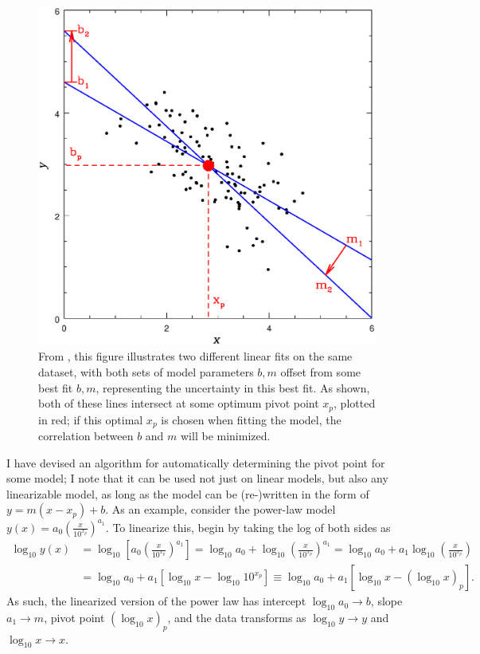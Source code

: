 \begin{figure}
    \centering
    \includegraphics[width=0.8\linewidth]{figures/fig_pivot.eps}
    \caption{From \textcite{trotter}, this figure illustrates two different linear fits on the same dataset, with both sets of model parameters $b,m$ offset from some best fit $b,m$, representing the uncertainty in this best fit. As shown, both of these lines intersect at some optimum pivot point $x_p$, plotted in red; if this optimal $x_p$ is chosen when fitting the model, the correlation between $b$ and $m$ will be minimized.}
    \label{fig:pivotpoint}
\end{figure}

I have devised an algorithm for automatically determining the pivot point for some model; I note that it can be used not just on linear models, but also any linearizable model, as long as the model can be (re-)written in the form of $y=m(x-x_p)+b$. As an example, consider the power-law model $\displaystyle y(x)=a_0\left(\frac{x}{10^{x_p}}\right)^{a_1}$. To linearize this, begin by taking the log of both sides as
\begin{equation}
\begin{split}
    \log_{10}y(x)&=\log_{10}\left[a_0\left(\frac{x}{10^{x_p}}\right)^{a_1}\right]=\log_{10}a_0 + \log_{10}\left(\frac{x}{10^{x_p}}\right)^{a_1}=\log_{10}a_0 + a_1\log_{10}\left(\frac{x}{10^{x_p}}\right)\\&= \log_{10}a_0 + a_1\left[\log_{10}x - \log_{10}10^{x_p}\right] \equiv \log_{10}a_0 + a_1\left[\log_{10}x - (\log_{10}x)_p\right].
\end{split}
\end{equation}
As such, the linearized version of the power law has intercept $\log_{10}a_0\rightarrow b$, slope $a_1\rightarrow m$, pivot point $(\log_{10}x)_p$, and the data transforms as $\log_{10}y\rightarrow y$ and $\log_{10}x\rightarrow x$.

